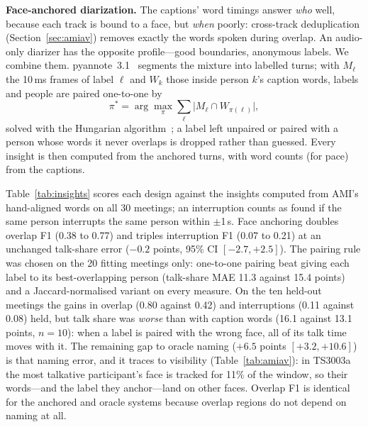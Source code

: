\textbf{Face-anchored diarization.} The captions' word timings answer \emph{who} well, because each track is bound to a face, but \emph{when} poorly: cross-track deduplication (Section~\ref{sec:amiav}) removes exactly the words spoken during overlap. An audio-only diarizer has the opposite profile---good boundaries, anonymous labels. We combine them. pyannote~3.1~\cite{bredin2020pyannote,plaquet2023powerset} segments the mixture into labelled turns; with $M_\ell$ the 10\,ms frames of label $\ell$ and $W_k$ those inside person $k$'s caption words, labels and people are paired one-to-one by
\begin{equation}
\pi^{*} = \arg\max_{\pi} \sum_{\ell} \lvert M_\ell \cap W_{\pi(\ell)} \rvert ,
\label{eq:anchor}
\end{equation}
solved with the Hungarian algorithm~\cite{kuhn1955hungarian}; a label left unpaired or paired with a person whose words it never overlaps is dropped rather than guessed. Every insight is then computed from the anchored turns, with word counts (for pace) from the captions.

\begin{table}[t]
\centering
\caption{Conversation insights on 30 AMI-AV meetings against the same insights from AMI's word alignments. MAE of talk share in percentage points (95\% bootstrap CI); F1 pooled over meetings. $^\ast$labels named by the reference, not achievable in a product.}
\label{tab:insights}
\footnotesize
\setlength{\tabcolsep}{3pt}

\end{table}

Table~\ref{tab:insights} scores each design against the insights computed from AMI's hand-aligned words on all 30 meetings; an interruption counts as found if the same person interrupts the same person within $\pm$1\,s. Face anchoring doubles overlap F1 (0.38 to 0.77) and triples interruption F1 (0.07 to 0.21) at an unchanged talk-share error ($-0.2$ points, 95\% CI $[-2.7, +2.5]$). The pairing rule was chosen on the 20 fitting meetings only: one-to-one pairing beat giving each label to its best-overlapping person (talk-share MAE 11.3 against 15.4 points) and a Jaccard-normalised variant on every measure. On the ten held-out meetings the gains in overlap (0.80 against 0.42) and interruptions (0.11 against 0.08) held, but talk share was \emph{worse} than with caption words (16.1 against 13.1 points, $n{=}10$): when a label is paired with the wrong face, all of its talk time moves with it. The remaining gap to oracle naming ($+6.5$ points $[+3.2, +10.6]$) is that naming error, and it traces to visibility (Table~\ref{tab:amiav}): in TS3003a the most talkative participant's face is tracked for 11\% of the window, so their words---and the label they anchor---land on other faces. Overlap F1 is identical for the anchored and oracle systems because overlap regions do not depend on naming at all.

